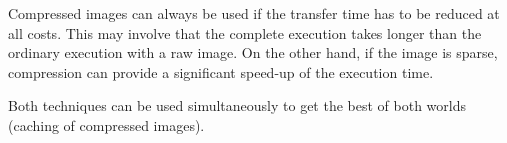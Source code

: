 Compressed  images can  always be  used  if the  transfer time  has to  be
reduced at all  costs. This may involve that  the complete execution takes
longer than the  ordinary execution with a raw image.   On the other hand,
if the image is sparse,  compression can provide a significant speed-up of
the execution time.

Both techniques can be used simultaneously  to get the best of both worlds
(\ie caching of compressed images).






